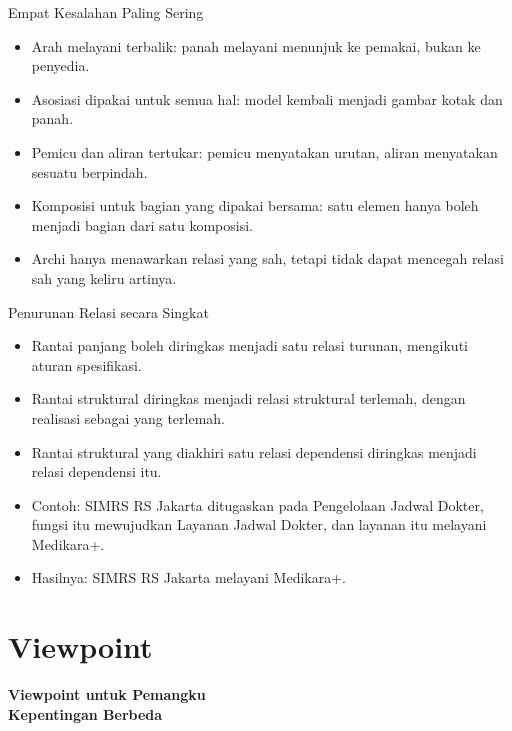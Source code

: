 \documentclass[aspectratio=169, table, 12pt]{beamer}
\begin{document}
\begin{frame}{{\Large Empat Kesalahan Paling Sering}}
  \vspace{6pt}
  \small
  \begin{itemize}
    \item Arah melayani terbalik: panah melayani menunjuk ke pemakai, bukan ke penyedia.
    \item Asosiasi dipakai untuk semua hal: model kembali menjadi gambar kotak dan panah.
    \item Pemicu dan aliran tertukar: pemicu menyatakan urutan, aliran menyatakan sesuatu berpindah.
    \item Komposisi untuk bagian yang dipakai bersama: satu elemen hanya boleh menjadi bagian dari satu
          komposisi.
    \item Archi hanya menawarkan relasi yang sah, tetapi tidak dapat mencegah relasi sah yang keliru
          artinya.
  \end{itemize}
\end{frame}

\begin{frame}{{\Large Penurunan Relasi secara Singkat}}
  \vspace{6pt}
  \small
  \begin{itemize}
    \item Rantai panjang boleh diringkas menjadi satu relasi turunan, mengikuti aturan spesifikasi.
    \item Rantai struktural diringkas menjadi relasi struktural terlemah, dengan realisasi sebagai yang
          terlemah.
    \item Rantai struktural yang diakhiri satu relasi dependensi diringkas menjadi relasi dependensi itu.
    \item Contoh: SIMRS RS Jakarta ditugaskan pada Pengelolaan Jadwal Dokter, fungsi itu mewujudkan
          Layanan Jadwal Dokter, dan layanan itu melayani Medikara+.
    \item Hasilnya: SIMRS RS Jakarta melayani Medikara+.
  \end{itemize}
\end{frame}

\section{Viewpoint}

\begin{frame}{\hfill}
  \centering
  \Huge{\textbf{Viewpoint untuk Pemangku\\Kepentingan Berbeda}}
\end{frame}
\end{document}
